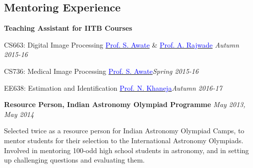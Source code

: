 \documentclass[margin,line]{res}
\newenvironment{list1}{
  \begin{list}{\ding{113}}{%
      \setlength{\itemsep}{0in}
      \setlength{\parsep}{0in} \setlength{\parskip}{0in}
      \setlength{\topsep}{0in} \setlength{\partopsep}{0in} 
      \setlength{\leftmargin}{0.17in}}}{\end{list}}
\begin{document}
\begin{resume}
\section{\sc Mentoring Experience}
\textbf{Teaching Assistant for IITB Courses}
\begin{list1}
\item[] CS663: Digital Image Processing \hspace{0.5cm} \href{https://www.cse.iitb.ac.in/~suyash}{\textcolor{blue}{Prof. S. Awate}} \& \href{https://www.cse.iitb.ac.in/~ajitvr}{\textcolor{blue}{Prof. A. Rajwade}} \hfill{\textit{Autumn 2015-16}}
\item[] CS736: Medical Image Processing \hspace{2cm} \href{https://www.cse.iitb.ac.in/~suyash}{\textcolor{blue}{Prof. S. Awate}}\hfill{\textit{Spring 2015-16}}
\item[] EE638: Estimation and Identification \hspace{1.25cm} \href{https://www.ee.iitb.ac.in/course/~ee638/Navin}{\textcolor{blue}{Prof. N. Khaneja}}\hfill{\textit{Autumn 2016-17}}
\end{list1}

\vspace*{-0.1in}

\textbf{Resource Person, Indian Astronomy Olympiad Programme} \hfill \textit{May 2013, May 2014} \\
\vspace*{-.15in}
\begin{list1}
\item[] Selected twice as a resource person for Indian Astronomy Olympiad Camps, to mentor students for their selection to the International Astronomy Olympiads. Involved in mentoring 100-odd high school students in astronomy, and in setting up challenging questions and evaluating them.
\end{list1}


\end{resume}
\end{document}
